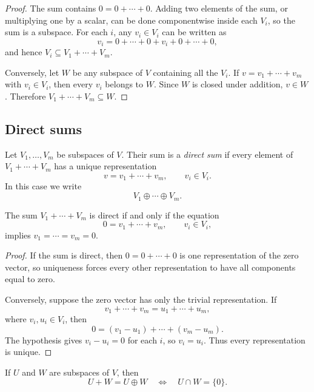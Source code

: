\begin{proof}
  The sum contains $0=0+\cdots+0$. Adding two elements of the sum, or
  multiplying one by a scalar, can be done componentwise inside each
  $V_i$, so the sum is a subspace. For each $i$, any $v_i\in V_i$ can be
  written as
  \[
    v_i=0+\cdots+0+v_i+0+\cdots+0,
  \]
  and hence $V_i\subseteq V_1+\cdots+V_m$.

  Conversely, let $W$ be any subspace of $V$ containing all the $V_i$.
  If $v=v_1+\cdots+v_m$ with $v_i\in V_i$, then every $v_i$ belongs to
  $W$. Since $W$ is closed under addition, $v\in W$. Therefore
  $V_1+\cdots+V_m\subseteq W$.
\end{proof}

\subsection{Direct sums}

\begin{definition}
  Let $V_1,\ldots,V_m$ be subspaces of $V$. Their sum is a
  \emph{direct sum} if every element of $V_1+\cdots+V_m$ has a unique
  representation
  \[
    v=v_1+\cdots+v_m,
    \qquad v_i\in V_i.
  \]
  In this case we write
  \[
    V_1\oplus\cdots\oplus V_m.
  \]
\end{definition}

\begin{proposition}
  The sum $V_1+\cdots+V_m$ is direct if and only if the equation
  \[
    0=v_1+\cdots+v_m,
    \qquad v_i\in V_i,
  \]
  implies $v_1=\cdots=v_m=0$.
\end{proposition}

\begin{proof}
  If the sum is direct, then $0=0+\cdots+0$ is one representation of
  the zero vector, so uniqueness forces every other representation to
  have all components equal to zero.

  Conversely, suppose the zero vector has only the trivial
  representation. If
  \[
    v_1+\cdots+v_m=u_1+\cdots+u_m,
  \]
  where $v_i,u_i\in V_i$, then
  \[
    0=(v_1-u_1)+\cdots+(v_m-u_m).
  \]
  The hypothesis gives $v_i-u_i=0$ for each $i$, so $v_i=u_i$. Thus
  every representation is unique.
\end{proof}

\begin{proposition}
  If $U$ and $W$ are subspaces of $V$, then
  \[
    U+W=U\oplus W
    \quad\Longleftrightarrow\quad
    U\cap W=\{0\}.
  \]
\end{proposition}

